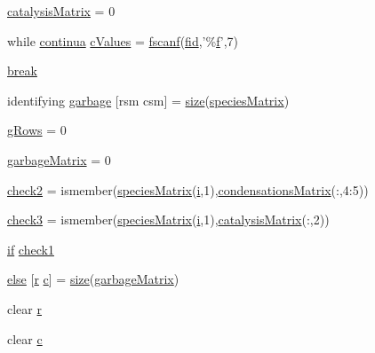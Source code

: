 \begin{DoxyCompactItemize}
\item 
\hyperlink{a00027_a0810027f58d6be965e44b7b84c44ace8}{catalysis\-Matrix} = 0
\item 
while \hyperlink{a00030_a9c951ebd5bc3f1adce943bee1255f4d6}{continua} \hyperlink{a00027_ad4ba7701967c1da20171228afccb7081}{c\-Values} = \hyperlink{a00025_a028ac102a731e62fb0a7439381f566c1}{fscanf}(\hyperlink{a00031_ae9011d40c6f13e68e6f07156e0da7c5d}{fid},'\%\hyperlink{a00025_a9c5a71c46b1abb8b7df5ebeac6c81535}{f}',7)
\item 
\hyperlink{a00027_a91cf6fbebedd86150a36e5ac3d5d3bfc}{break}
\item 
identifying \hyperlink{a00027_abe2562f47a009cdc636cec6fe7b1036b}{garbage} \mbox{[}rsm csm\mbox{]} = \hyperlink{a00062_ae113ea7f9e515a12ac4b5595c6faf61e}{size}(\hyperlink{a00027_ab9e70ab48bc489696c53ad7946d9dfd2}{species\-Matrix})
\item 
\hyperlink{a00027_af33e0ef530936979d29418a30cb262d0}{g\-Rows} = 0
\item 
\hyperlink{a00027_a81fbeed23d0dfd3b031fce1839f131fe}{garbage\-Matrix} = 0
\item 
\hyperlink{a00027_a98a8838a85ed24032563a44271b1525a}{check2} = ismember(\hyperlink{a00027_ab9e70ab48bc489696c53ad7946d9dfd2}{species\-Matrix}(\hyperlink{a00071_ad3efca1ea6e3333daf30719ee0501862}{i},1),\hyperlink{a00030_a84a949cdae2c03193c84caf27f855b30}{condensations\-Matrix}(\-:,4\-:5))
\item 
\hyperlink{a00027_adfd17509248a56986475a25ee50fe488}{check3} = ismember(\hyperlink{a00027_ab9e70ab48bc489696c53ad7946d9dfd2}{species\-Matrix}(\hyperlink{a00071_ad3efca1ea6e3333daf30719ee0501862}{i},1),\hyperlink{a00030_a244eec8903103b5bbddef461276286ce}{catalysis\-Matrix}(\-:,2))
\item 
\hyperlink{a00030_a01d55766b8058903dd360b4bda71f9f5}{if} \hyperlink{a00027_a62c10db322670bdabb633eb294c4fcec}{check1}
\item 
\hyperlink{a00027_af5946383720aa572eb93e1e63afc23c2}{else} \mbox{[}\hyperlink{a00031_ac862e7284527eb913b1351c8bfb8e079}{r} \hyperlink{a00035_a6be92348ba85ef257b11d06209e1d7b6}{c}\mbox{]} = \hyperlink{a00062_ae113ea7f9e515a12ac4b5595c6faf61e}{size}(\hyperlink{a00027_acdc35755c8d07d7b7df426e77ae26506}{garbage\-Matrix})
\item 
clear \hyperlink{a00027_ac862e7284527eb913b1351c8bfb8e079}{r}
\item 
clear \hyperlink{a00027_a8e54ca14679a1ce9245a3b7d55d95570}{c}
\end{DoxyCompactItemize}


